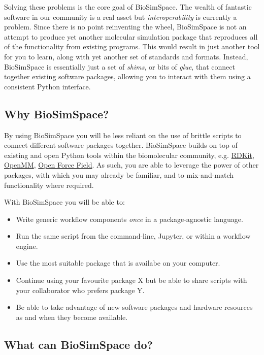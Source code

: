 Solving these problems is the core goal of BioSimSpace. The wealth of
fantastic software in our community is a real asset but
\emph{interoperability} is currently a problem. Since there is no point
reinventing the wheel, BioSimSpace is not an attempt to produce yet
another molecular simulation package that reproduces all of the
functionality from existing programs. This would result in just another
tool for you to learn, along with yet another set of standards and
formats. Instead, BioSimSpace is essentially just a set of \emph{shims},
or bits of \emph{glue}, that connect together existing software
packages, allowing you to interact with them using a consistent Python
interface.

\hypertarget{why-biosimspace}{%
\subsection{Why BioSimSpace?}\label{why-biosimspace}}

By using BioSimSpace you will be less reliant on the use of brittle
scripts to connect different software packages together. BioSimSpace
builds on top of existing and open Python tools within the biomolecular
community, e.g. \href{https://www.rdkit.org/}{RDKit},
\href{http://openmm.org/}{OpenMM},
\href{https://github.com/openforcefield/openff-toolkit}{Open Force
Field}. As such, you are able to leverage the power of other packages,
with which you may already be familiar, and to mix-and-match
functionality where required.

With BioSimSpace you will be able to:

\begin{itemize}
\tightlist
\item
  Write generic workflow components \emph{once} in a package-agnostic
  language.
\item
  Run the same script from the command-line, Jupyter, or within a
  workflow engine.
\item
  Use the most suitable package that is availabe on your computer.
\item
  Continue using your favourite package X but be able to share scripts
  with your collaborator who prefers package Y.
\item
  Be able to take advantage of new software packages and hardware
  resources as and when they become available.
\end{itemize}

\hypertarget{what-can-biosimspace-do}{%
\subsection{What can BioSimSpace do?}\label{what-can-biosimspace-do}}

